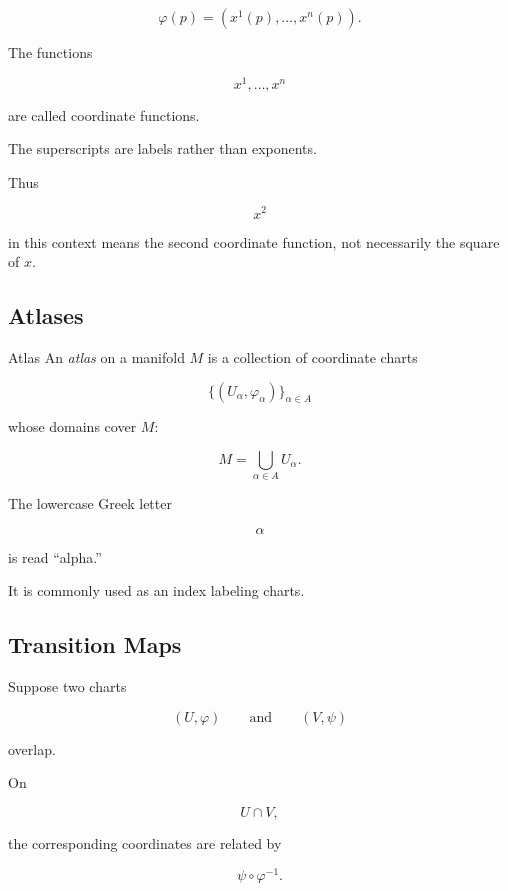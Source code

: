 \[
\varphi(p)
=
\left(
x^1(p),\ldots,x^n(p)
\right).
\]

The functions

\[
\boxed{
x^1,\ldots,x^n
}
\]

are called coordinate functions.

The superscripts are labels rather than exponents.

Thus

\[
x^2
\]

in this context means the second coordinate function, not necessarily the
square of \(x\).

\subsection{Atlases}
\label{subsec:atlases-manifolds}

\begin{definitionbox}{Atlas}
An \emph{atlas} on a manifold \(M\) is a collection of coordinate charts

\[
\boxed{
\{(U_\alpha,\varphi_\alpha)\}_{\alpha\in A}
}
\]

whose domains cover \(M\):

\[
\boxed{
M=\bigcup_{\alpha\in A}U_\alpha.
}
\]
\end{definitionbox}

The lowercase Greek letter

\[
\alpha
\]

is read ``alpha.''

It is commonly used as an index labeling charts.

\subsection{Transition Maps}
\label{subsec:transition-maps-manifolds}

Suppose two charts

\[
(U,\varphi)
\qquad\text{and}\qquad
(V,\psi)
\]

overlap.

On

\[
U\cap V,
\]

the corresponding coordinates are related by

\[
\boxed{
\psi\circ\varphi^{-1}.
}
\]

